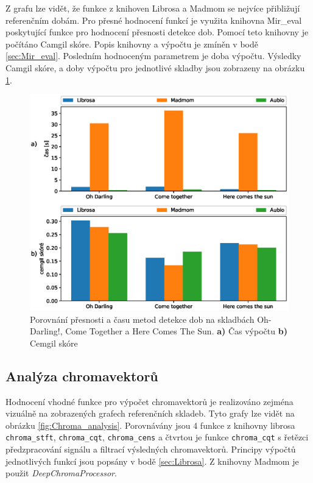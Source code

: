Z grafu lze vidět, že funkce z knihoven Librosa a Madmom se nejvíce přibližují referenčním dobám. Pro přesné hodnocení funkcí je využita knihovna Mir\_eval poskytující funkce pro hodnocení přesnosti detekce dob. Pomocí teto knihovny je počítáno Camgil skóre. Popis knihovny a výpočtu je zmíněn v bodě \ref{sec:Mir_eval}. Posledním hodnoceným parametrem je doba výpočtu. Výsledky Camgil skóre, a doby výpočtu pro jednotlivé skladby jsou zobrazeny na obrázku \ref{fig:Beat_tracking_time_and_cemgil}.

\begin{figure}[H]
    \centering
    \includegraphics[width = 1\linewidth]{obrazky/Beat_tracking_time_and_cemgil_graphs.eps}
    \caption{Porovnání přesnosti a času metod detekce dob na skladbách Oh-Darling!, Come Together a Here Comes The Sun. \textbf{a)} Čas výpočtu \textbf{b)} Cemgil skóre}
    \label{fig:Beat_tracking_time_and_cemgil}
\end{figure}

\subsection{Analýza chromavektorů}

Hodnocení vhodné funkce pro výpočet chromavektorů je realizováno zejména vizuálně na zobrazených grafech referenčních skladeb. Tyto grafy lze vidět na obrázku \ref{fig:Chroma_analysis}. Porovnávány jsou 4 funkce z knihovny librosa \texttt{chroma\_stft}, \texttt{chroma\_cqt}, \texttt{chroma\_cens} a čtvrtou je funkce \texttt{chroma\_cqt} s řetězci předzpracování signálu a filtrací výsledných chromavektorů. Principy výpočtů jednotlivých funkcí jsou popsány v bodě \ref{sec:Librosa}. Z knihovny Madmom je použit \textit{DeepChromaProcessor}.


